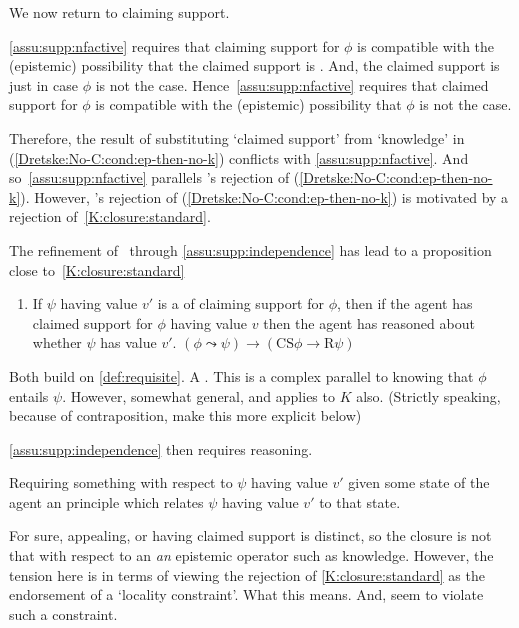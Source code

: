 \begin{note}
  We now return to claiming support.

  \autoref{assu:supp:nfactive} requires that claiming support for \(\phi\) is compatible with the (epistemic) possibility that the claimed support is \nmom{}.
  And, the claimed support is \misled{} just in case \(\phi\) is not the case.
  Hence~\autoref{assu:supp:nfactive} requires that claimed support for \(\phi\) is compatible with the (epistemic) possibility that \(\phi\) is not the case.

  Therefore, the result of substituting `claimed support' from `knowledge' in (\ref{Dretske:No-C:cond:ep-then-no-k}) conflicts with \autoref{assu:supp:nfactive}.
  And so~\autoref{assu:supp:nfactive} parallels \citeauthor{Dretske:1970to}'s rejection of (\ref{Dretske:No-C:cond:ep-then-no-k}).
  However, \citeauthor{Dretske:1970to}'s rejection of (\ref{Dretske:No-C:cond:ep-then-no-k}) is motivated by a rejection of~\ref{K:closure:standard}.
\end{note}

\begin{note}[Link]
  The refinement of~\ideaCS{} through \autoref{assu:supp:independence} has lead to a proposition close to~\ref{K:closure:standard}

  \begin{enumerate}[label=P\ref{prop:CS-only-if-reason-recognised-defeaters}\('\).]
  \item If \(\psi\) having value \(v'\) is a \requ{} of claiming support for \(\phi\), then if the agent has claimed support for \(\phi\) having value \(v\) then the agent has reasoned about whether \(\psi\) has value \(v'\).\newline
    \mbox{}\hfill \((\phi \leadsto \psi) \rightarrow (\text{CS}\phi \rightarrow \text{R}\psi)\)
  \end{enumerate}

  Both build on \autoref{def:requisite}.
  A \requ{}.
  This is a complex parallel to knowing that \(\phi\) entails \(\psi\).
  However, somewhat general, and applies to \(K\) also.
  {\color{red} (Strictly speaking, because of contraposition, make this more explicit below)}

  \autoref{assu:supp:independence} then requires reasoning.

  Requiring something with respect to \(\psi\) having value \(v'\) given some state of the agent an principle which relates \(\psi\) having value \(v'\) to that state.

  For sure, appealing, or having claimed support is distinct, so the closure is not that with respect to an \emph{an} epistemic operator such as knowledge.
  However, the tension here is in terms of viewing the rejection of \ref{K:closure:standard} as the endorsement of a `locality constraint'.
  {\color{red} What this means.}
  And, seem to violate such a constraint.
\end{note}

